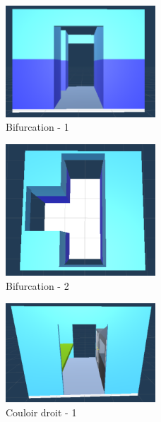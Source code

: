 \documentclass{article}
\begin{document}
\par\vspace{0.5cm}
\begin{figure}[!ht]
    \centering
    \includegraphics[width=0.5\textwidth]{Bifurc Bas.PNG}
    \caption{Bifurcation - 1}
    \label{Bifurcation - 1}
\end{figure}{}
\par\vspace{0.5cm}
\begin{figure}[!ht]
    \centering
    \includegraphics[width=0.5\textwidth]{Bifurc Haut.PNG}
    \caption{Bifurcation - 2}
    \label{Bifurcation - 2}
\end{figure}{}
\par\vspace{0.5cm}
\begin{figure}[!ht]
    \centering
    \includegraphics[width=0.5\textwidth]{Droit Bas.PNG}
    \caption{Couloir droit - 1}
    \label{Couloir droit - 1}
\end{figure}{}
\par\vspace{0.5cm}
\end{document}
